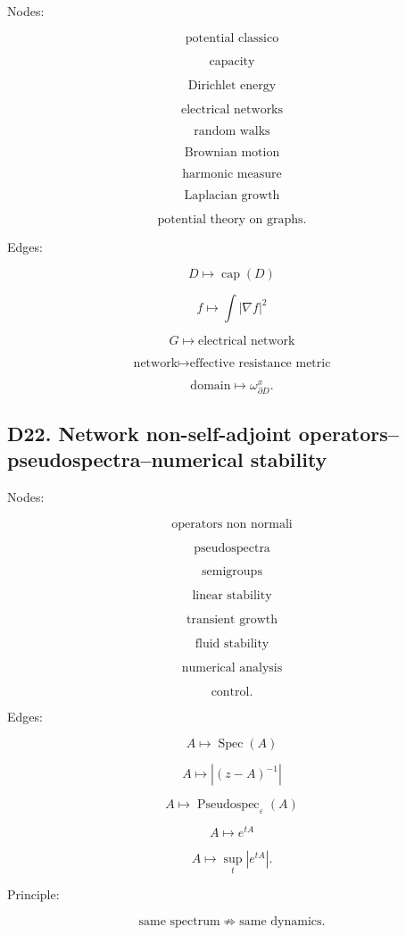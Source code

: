 \documentclass[11pt]{article}
\begin{document}
Nodes:

\[
\text{potential classico}
\]

\[
\text{capacity}
\]

\[
\text{Dirichlet energy}
\]

\[
\text{electrical networks}
\]

\[
\text{random walks}
\]

\[
\text{Brownian motion}
\]

\[
\text{harmonic measure}
\]

\[
\text{Laplacian growth}
\]

\[
\text{potential theory on graphs}.
\]

Edges:

\[
D\mapsto \operatorname{cap}(D)
\]

\[
f\mapsto \int|\nabla f|^2
\]

\[
G\mapsto \text{electrical network}
\]

\[
\text{network}\mapsto \text{effective resistance metric}
\]

\[
\text{domain}\mapsto \omega^x_{\partial D}.
\]



\subsection{D22. Network non-self-adjoint operators--pseudospectra--numerical stability}

Nodes:

\[
\text{operators non normali}
\]

\[
\text{pseudospectra}
\]

\[
\text{semigroups}
\]

\[
\text{linear stability}
\]

\[
\text{transient growth}
\]

\[
\text{fluid stability}
\]

\[
\text{numerical analysis}
\]

\[
\text{control}.
\]

Edges:

\[
A\mapsto \operatorname{Spec}(A)
\]

\[
A\mapsto |(z-A)^{-1}|
\]

\[
A\mapsto \operatorname{Pseudospec}_\varepsilon(A)
\]

\[
A\mapsto e^{tA}
\]

\[
A\mapsto \sup_t|e^{tA}|.
\]

Principle:

\[
\text{same spectrum}
\not\Rightarrow
\text{same dynamics}.
\]
\end{document}
